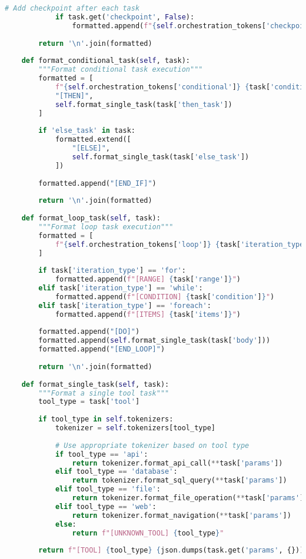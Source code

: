\begin{lstlisting}[language=Python, caption=Multi-tool orchestration system]
            # Add checkpoint after each task
            if task.get('checkpoint', False):
                formatted.append(f"{self.orchestration_tokens['checkpoint']} step_{i}")
        
        return '\n'.join(formatted)
    
    def format_conditional_task(self, task):
        """Format conditional task execution"""
        formatted = [
            f"{self.orchestration_tokens['conditional']} {task['condition']}",
            "[THEN]",
            self.format_single_task(task['then_task'])
        ]
        
        if 'else_task' in task:
            formatted.extend([
                "[ELSE]",
                self.format_single_task(task['else_task'])
            ])
        
        formatted.append("[END_IF]")
        
        return '\n'.join(formatted)
    
    def format_loop_task(self, task):
        """Format loop task execution"""
        formatted = [
            f"{self.orchestration_tokens['loop']} {task['iteration_type']}"
        ]
        
        if task['iteration_type'] == 'for':
            formatted.append(f"[RANGE] {task['range']}")
        elif task['iteration_type'] == 'while':
            formatted.append(f"[CONDITION] {task['condition']}")
        elif task['iteration_type'] == 'foreach':
            formatted.append(f"[ITEMS] {task['items']}")
        
        formatted.append("[DO]")
        formatted.append(self.format_single_task(task['body']))
        formatted.append("[END_LOOP]")
        
        return '\n'.join(formatted)
    
    def format_single_task(self, task):
        """Format a single tool task"""
        tool_type = task['tool']
        
        if tool_type in self.tokenizers:
            tokenizer = self.tokenizers[tool_type]
            
            # Use appropriate tokenizer based on tool type
            if tool_type == 'api':
                return tokenizer.format_api_call(**task['params'])
            elif tool_type == 'database':
                return tokenizer.format_sql_query(**task['params'])
            elif tool_type == 'file':
                return tokenizer.format_file_operation(**task['params'])
            elif tool_type == 'web':
                return tokenizer.format_navigation(**task['params'])
            else:
                return f"[UNKNOWN_TOOL] {tool_type}"
        
        return f"[TOOL] {tool_type} {json.dumps(task.get('params', {}))}"
\end{lstlisting}

